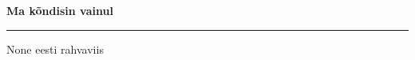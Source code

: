 \documentclass[10pt]{book}
\begin{document}
{
  \samepage
  \raggedbottom
  \raggedright
  \sloppy


  \vspace{0.2in}

  \noindent\begin{minipage}{.1\textwidth}
    \hfill\vspace{0.1in}
  \end{minipage}%
  \noindent\begin{minipage}{.8\textwidth}
    \centering
    \bfseries
    \large Ma k\~ondisin vainul
  \end{minipage}%
  \noindent\begin{minipage}{.1\textwidth}
      \hfill\vspace{0.1in}
  \end{minipage}

  \nopagebreak[4]
  \vspace{0.1in}
  \nopagebreak[4]
  \hrule height 0.05ex
  \nopagebreak[4]
  \vspace{-0.05in}

  {\footnotesize None \hfill eesti rahvaviis }\\
  \vspace{0.01in}



}
\end{document}
